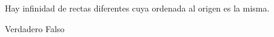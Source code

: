 Hay infinidad de rectas diferentes cuya ordenada al origen es la misma.

\begin{choices}
    \CorrectChoice Verdadero
    \choice Falso
\end{choices}
